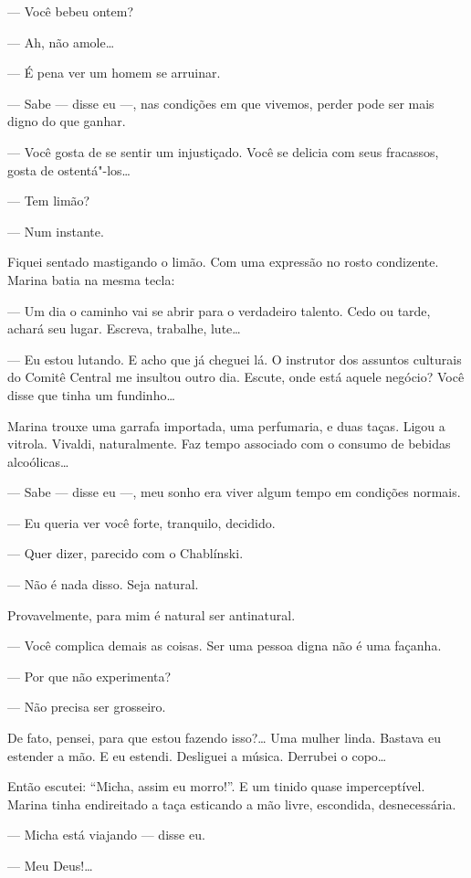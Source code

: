 --- Você bebeu ontem?

--- Ah, não amole\ldots{}

--- É pena ver um homem se arruinar.

--- Sabe --- disse eu ---, nas condições em que vivemos, perder pode ser
mais digno do que ganhar.

--- Você gosta de se sentir um injustiçado. Você se delicia com seus
fracassos, gosta de ostentá"-los\ldots{}

--- Tem limão?

--- Num instante.

Fiquei sentado mastigando o limão. Com uma expressão no rosto
condizente. Marina batia na mesma tecla:

--- Um dia o caminho vai se abrir para o verdadeiro talento. Cedo ou
tarde, achará seu lugar. Escreva, trabalhe, lute\ldots{}

--- Eu estou lutando. E acho que já cheguei lá. O instrutor dos assuntos
culturais do Comitê Central me insultou outro dia. Escute, onde está
aquele negócio? Você disse que tinha um fundinho\ldots{}

Marina trouxe uma garrafa importada, uma perfumaria, e duas
taças. Ligou a vitrola. Vivaldi, naturalmente. Faz tempo associado com o
consumo de bebidas alcoólicas\ldots{}

--- Sabe --- disse eu ---, meu sonho era viver algum tempo em condições
normais.

--- Eu queria ver você forte, tranquilo, decidido.

--- Quer dizer, parecido com o Chablínski.

--- Não é nada disso. Seja natural.

Provavelmente, para mim é natural ser antinatural.

--- Você complica demais as coisas. Ser uma pessoa digna não é uma
façanha.

--- Por que não experimenta?

--- Não precisa ser grosseiro.

De fato, pensei, para que estou fazendo isso?\ldots{} Uma mulher linda.
Bastava eu estender a mão. E eu estendi. Desliguei a música. Derrubei o
copo\ldots{}

Então escutei: ``Micha, assim eu morro!''. E um tinido quase
imperceptível. Marina tinha endireitado a taça esticando a mão livre,
escondida, desnecessária.

--- Micha está viajando --- disse eu.

--- Meu Deus!\ldots{}

